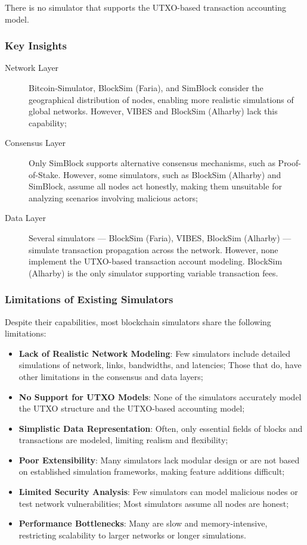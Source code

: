 There is no simulator that supports the UTXO-based transaction accounting
model.

\subsubsection{Key Insights}\label{subsubsec:key-insights}

\begin{description}
	\item[Network Layer] Bitcoin-Simulator, BlockSim (Faria), and SimBlock
		consider the geographical distribution of nodes, enabling more
		realistic simulations of global networks. However, VIBES and
		BlockSim (Alharby) lack this capability;
	\item[Consensus Layer] Only SimBlock supports alternative consensus
		mechanisms, such as Proof-of-Stake. However, some simulators,
		such as BlockSim (Alharby) and SimBlock, assume all nodes act
		honestly, making them unsuitable for analyzing scenarios
		involving malicious actors;
	\item[Data Layer] Several simulators --- BlockSim (Faria), VIBES,
		BlockSim (Alharby) --- simulate transaction propagation across
		the network. However, none implement the UTXO-based transaction
		account modeling. BlockSim (Alharby) is the only simulator
		supporting variable transaction fees.
\end{description}

\subsubsection{Limitations of Existing Simulators}\label{subsubsec:limitations}

Despite their capabilities, most blockchain simulators share the following
limitations:
\begin{itemize}
	\item \textbf{Lack of Realistic Network Modeling}: Few simulators
		include detailed simulations of network, links, bandwidths, and
		latencies; Those that do, have other limitations in the
		consensus and data layers;
	\item \textbf{No Support for UTXO Models}: None of the simulators
		accurately model the UTXO structure and the UTXO-based
		accounting model;
	\item \textbf{Simplistic Data Representation}: Often, only essential
		fields of blocks and transactions are modeled, limiting
		realism and flexibility;
	\item \textbf{Poor Extensibility}: Many simulators lack modular design
		or are not based on established simulation frameworks, making
		feature additions difficult;
	\item \textbf{Limited Security Analysis}: Few simulators can model
		malicious nodes or test network vulnerabilities; Most
		simulators assume all nodes are honest;
	\item \textbf{Performance Bottlenecks}: Many are slow and
		memory-intensive, restricting scalability to larger networks or
		longer simulations.
\end{itemize}

